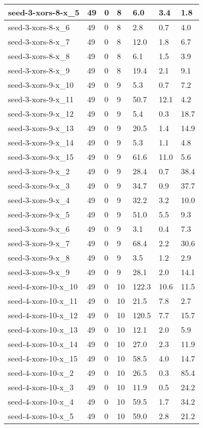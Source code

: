 \begin{scriptsize}
\begin{longtable}{|p{5cm}|l|l|l|l|l|l|}
seed-3-xors-8-x\_5&49&0&8&6.0&3.4&1.8 \\ \hline 
seed-3-xors-8-x\_6&49&0&8&2.8&0.7&4.0 \\ \hline 
seed-3-xors-8-x\_7&49&0&8&12.0&1.8&6.7 \\ \hline 
seed-3-xors-8-x\_8&49&0&8&6.1&1.5&3.9 \\ \hline 
seed-3-xors-8-x\_9&49&0&8&19.4&2.1&9.1 \\ \hline 
seed-3-xors-9-x\_10&49&0&9&5.3&0.7&7.2 \\ \hline 
seed-3-xors-9-x\_11&49&0&9&50.7&12.1&4.2 \\ \hline 
seed-3-xors-9-x\_12&49&0&9&5.4&0.3&18.7 \\ \hline 
seed-3-xors-9-x\_13&49&0&9&20.5&1.4&14.9 \\ \hline 
seed-3-xors-9-x\_14&49&0&9&5.3&1.1&4.8 \\ \hline 
seed-3-xors-9-x\_15&49&0&9&61.6&11.0&5.6 \\ \hline 
seed-3-xors-9-x\_2&49&0&9&28.4&0.7&38.4 \\ \hline 
seed-3-xors-9-x\_3&49&0&9&34.7&0.9&37.7 \\ \hline 
seed-3-xors-9-x\_4&49&0&9&32.2&3.2&10.0 \\ \hline 
seed-3-xors-9-x\_5&49&0&9&51.0&5.5&9.3 \\ \hline 
seed-3-xors-9-x\_6&49&0&9&3.1&0.4&7.3 \\ \hline 
seed-3-xors-9-x\_7&49&0&9&68.4&2.2&30.6 \\ \hline 
seed-3-xors-9-x\_8&49&0&9&3.5&1.2&2.9 \\ \hline 
seed-3-xors-9-x\_9&49&0&9&28.1&2.0&14.1 \\ \hline 
seed-4-xors-10-x\_10&49&0&10&122.3&10.6&11.5 \\ \hline 
seed-4-xors-10-x\_11&49&0&10&21.5&7.8&2.7 \\ \hline 
seed-4-xors-10-x\_12&49&0&10&120.5&7.7&15.7 \\ \hline 
seed-4-xors-10-x\_13&49&0&10&12.1&2.0&5.9 \\ \hline 
seed-4-xors-10-x\_14&49&0&10&27.0&2.3&11.9 \\ \hline 
seed-4-xors-10-x\_15&49&0&10&58.5&4.0&14.7 \\ \hline 
seed-4-xors-10-x\_2&49&0&10&26.5&0.3&85.4 \\ \hline 
seed-4-xors-10-x\_3&49&0&10&11.9&0.5&24.2 \\ \hline 
seed-4-xors-10-x\_4&49&0&10&59.5&1.7&34.2 \\ \hline 
seed-4-xors-10-x\_5&49&0&10&59.0&2.8&21.2 \\ \hline 

\end{longtable}
\end{scriptsize}
